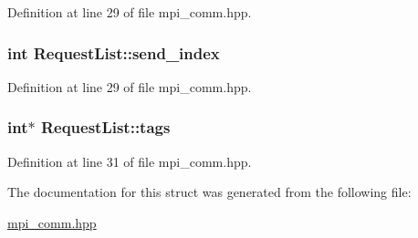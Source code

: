 Definition at line 29 of file mpi\_\-comm.hpp.\hypertarget{struct_request_list_aa05550eb607c8e406ce218f8ed63eb60}{
\subsubsection[{send\_\-index}]{\setlength{\rightskip}{0pt plus 5cm}int {\bf RequestList::send\_\-index}}}
\label{struct_request_list_aa05550eb607c8e406ce218f8ed63eb60}


Definition at line 29 of file mpi\_\-comm.hpp.\hypertarget{struct_request_list_af55f665f201ed2b1579ce2493229ec31}{
\subsubsection[{tags}]{\setlength{\rightskip}{0pt plus 5cm}int$\ast$ {\bf RequestList::tags}}}
\label{struct_request_list_af55f665f201ed2b1579ce2493229ec31}


Definition at line 31 of file mpi\_\-comm.hpp.

The documentation for this struct was generated from the following file:\begin{DoxyCompactItemize}
\item 
\hyperlink{mpi__comm_8hpp}{mpi\_\-comm.hpp}\end{DoxyCompactItemize}
